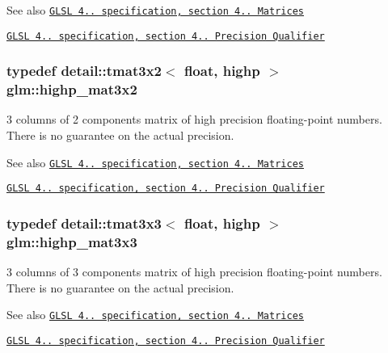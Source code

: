 \begin{DoxySeeAlso}{See also}
\href{http://www.opengl.org/registry/doc/GLSLangSpec.4.20.8.pdf}{\tt G\+L\+SL 4.. specification, section 4.. Matrices} 

\href{http://www.opengl.org/registry/doc/GLSLangSpec.4.20.8.pdf}{\tt G\+L\+SL 4.. specification, section 4.. Precision Qualifier} 
\end{DoxySeeAlso}
\subsubsection[{\texorpdfstring{highp\+\_\+mat3x2}{highp_mat3x2}}]{\setlength{\rightskip}{0pt plus 5cm}typedef detail\+::tmat3x2$<$ float, highp $>$ {\bf glm\+::highp\+\_\+mat3x2}}\hypertarget{group__core__precision_gabc7767293ff69cd56717ee9d8be62963}{}\label{group__core__precision_gabc7767293ff69cd56717ee9d8be62963}
3 columns of 2 components matrix of high precision floating-\/point numbers. There is no guarantee on the actual precision.

\begin{DoxySeeAlso}{See also}
\href{http://www.opengl.org/registry/doc/GLSLangSpec.4.20.8.pdf}{\tt G\+L\+SL 4.. specification, section 4.. Matrices} 

\href{http://www.opengl.org/registry/doc/GLSLangSpec.4.20.8.pdf}{\tt G\+L\+SL 4.. specification, section 4.. Precision Qualifier} 
\end{DoxySeeAlso}
\subsubsection[{\texorpdfstring{highp\+\_\+mat3x3}{highp_mat3x3}}]{\setlength{\rightskip}{0pt plus 5cm}typedef detail\+::tmat3x3$<$ float, highp $>$ {\bf glm\+::highp\+\_\+mat3x3}}\hypertarget{group__core__precision_ga8a3703cc71cdfc8928eddf46b3763c4b}{}\label{group__core__precision_ga8a3703cc71cdfc8928eddf46b3763c4b}
3 columns of 3 components matrix of high precision floating-\/point numbers. There is no guarantee on the actual precision.

\begin{DoxySeeAlso}{See also}
\href{http://www.opengl.org/registry/doc/GLSLangSpec.4.20.8.pdf}{\tt G\+L\+SL 4.. specification, section 4.. Matrices} 

\href{http://www.opengl.org/registry/doc/GLSLangSpec.4.20.8.pdf}{\tt G\+L\+SL 4.. specification, section 4.. Precision Qualifier} 
\end{DoxySeeAlso}
